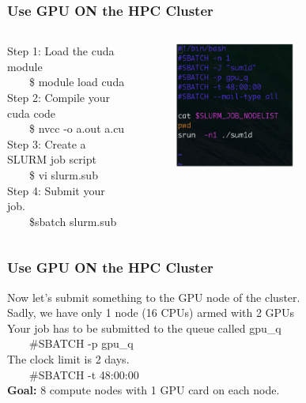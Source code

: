 \documentclass[xcolor={x11names,svgnames,dvipsnames}]{beamer}
\begin{document}
\begin{frame}
\frametitle{Use GPU ON the HPC Cluster}


\begin{columns}
\column{2.4in}
Step 1: Load the cuda module\\
\ \ \ \ \$ module load cuda\\
\vspace{1cm}
Step 2: Compile your cuda code\\
\ \ \ \ \$ nvcc -o a.out a.cu\\
\vspace{1cm}
Step 3: Create a SLURM job script\\
\ \ \ \ \$ vi slurm.sub\\
\vspace{1cm}
Step 4: Submit your job.\\
\ \ \ \ \$sbatch slurm.sub
\column{2.5in}
 \begin{figure}
     \includegraphics[width=0.6\textwidth, height=0.6\textheight]{script.png}
\end{figure}
\end{columns}

\end{frame}

\begin{frame}
\frametitle{Use GPU ON the HPC Cluster}
Now let’s submit something to the GPU node of the cluster.\\
\vspace{0.5cm}
Sadly, we have only 1 node (16 CPUs) armed with 2 GPUs\\
\vspace{0.5cm}
Your job has to be submitted to the queue called gpu\_q\\
\vspace{0.5cm}
\ \ \ \ #SBATCH -p gpu\_q\\
\vspace{0.5cm}
The clock limit is 2 days.\\
\vspace{0.5cm}
\ \ \ \ #SBATCH -t 48:00:00\\
\vspace{0.5cm}
\textbf{Goal:} 8 compute nodes with 1 GPU card on each node.
\end{frame}
\end{document}

